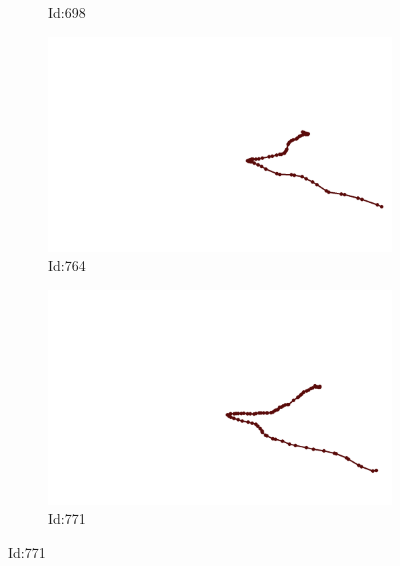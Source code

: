 \documentclass[12pt,twoside]{report}
\begin{document}
\begin{figure}
\begin{subfigure}[b]{0.20\textwidth}
\caption{Id:698}
\end{subfigure}
\begin{subfigure}[b]{0.20\textwidth}
\centering
\includegraphics[width=\textwidth]{../trajectories/764.png}
\caption{Id:764}
\end{subfigure}
\begin{subfigure}[b]{0.20\textwidth}
\centering
\includegraphics[width=\textwidth]{../trajectories/771.png}
\caption{Id:771}
\end{subfigure}
\end{figure}
\end{document}
